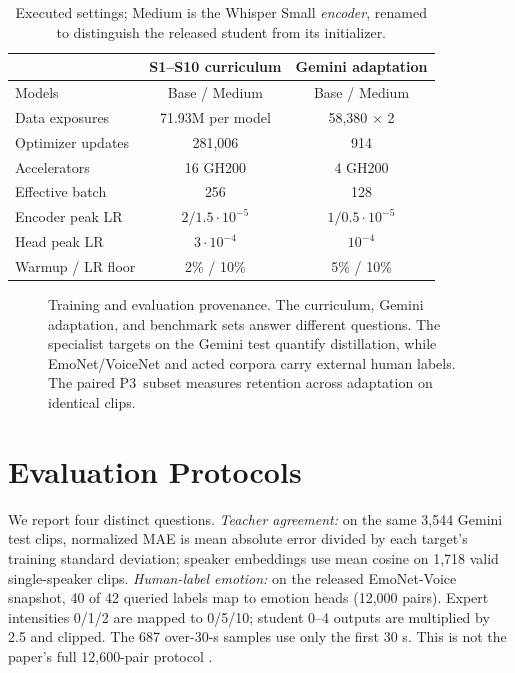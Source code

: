 \documentclass{article}
\newcommand{\pthree}{\textsc{P3}}
\begin{document}
\begin{table}[t]
\centering\small
\caption{Executed settings; Medium is the Whisper Small \emph{encoder}, renamed to distinguish the released student from its initializer.}
\label{tab:settings}
\begin{tabular}{@{}lcc@{}}\toprule
 & S1--S10 curriculum & Gemini adaptation \\\midrule
Models & Base / Medium & Base / Medium \\
Data exposures & 71.93M per model & 58,380 $\times$ 2 \\
Optimizer updates & 281,006 & 914 \\
Accelerators & 16 GH200 & 4 GH200 \\
Effective batch & 256 & 128 \\
Encoder peak LR & $2/1.5\cdot10^{-5}$ & $1/0.5\cdot10^{-5}$ \\
Head peak LR & $3\cdot10^{-4}$ & $10^{-4}$ \\
Warmup / LR floor & 2\% / 10\% & 5\% / 10\% \\
\bottomrule\end{tabular}
\end{table}

\begin{figure}[t]
\centering
\caption{Training and evaluation provenance. The curriculum, Gemini adaptation, and benchmark sets answer different questions. The specialist targets on the Gemini test quantify distillation, while EmoNet/VoiceNet and acted corpora carry external human labels. The paired \pthree\ subset measures retention across adaptation on identical clips.}
\label{fig:study-flow}
\end{figure}

\section{Evaluation Protocols}
We report four distinct questions. \emph{Teacher agreement:} on the same 3,544 Gemini test clips, normalized MAE is mean absolute error divided by each target's training standard deviation; speaker embeddings use mean cosine on 1,718 valid single-speaker clips. \emph{Human-label emotion:} on the released EmoNet-Voice snapshot, 40 of 42 queried labels map to emotion heads (12,000 pairs). Expert intensities 0/1/2 are mapped to 0/5/10; student 0--4 outputs are multiplied by 2.5 and clipped. The 687 over-30-s samples use only the first 30 s. This is not the paper's full 12,600-pair protocol \citep{schuhmann2025emonetvoice}.
\end{document}

